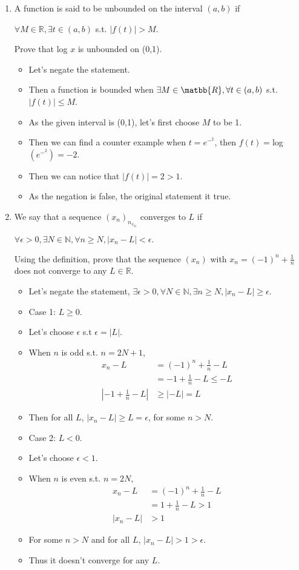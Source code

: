\documentclass[letterpaper,12pt]{article}
\begin{document}
\begin{enumerate}
\begin{itemize}
\end{itemize}
\item A function is said to be unbounded on the interval $(a,b)$ if 
\begin{center}
	$\forall M\in \mathbb{R}, \exists t\in (a,b)$ s.t. $|f(t)|>M.$
\end{center}
Prove that log $x$ is unbounded on (0,1).
\begin{itemize}
\item Let's negate the statement.
\item Then a function is bounded when $\exists M \in \matbb{R}, \forall t\in (a,b)$ s.t. $|f(t)| \leq M$.
\item As the given interval is (0,1), let's first choose $M$ to be 1.
\item Then we can find a counter example when $t=e^-^2$, then $f(t)=$log$(e^-^2)=-2$.
\item Then we can notice that $|f(t)|=2 > 1$.
\item As the negation is false, the original statement it true. 
\end{itemize}
\item We say that a sequence $(x_n)_n_\in_\mathbb{N}$ converges to $L$ if 
\begin{center}
$\forall \epsilon>0,\exists N \in \mathbb{N}, \forall n \geq N, |x_n-L|<\epsilon.$
\end{center}
Using the definition, prove that the sequence $(x_n)$ with $x_n = (-1)^n+\frac{1}{n}$ does not converge to any $L \in \mathbb{R}$.
\begin{itemize}
	\item Let's negate the statement, $\exists \epsilon>0,\forall N \in \mathbb{N},\exists n \geq N,|x_n-L| \geq \epsilon$.
	\item Case 1: $L \geq 0$.
	\item Let's choose $\epsilon$ s.t $\epsilon = |L|$.
	\item When $n$ is odd s.t. $n=2N+1$,
	\begin{align}
	x_n-L &= (-1)^n+\frac{1}{n}-L	 \\
	&=-1+\frac{1}{n}-L \leq-L \\|-1+\frac{1}{n}-L| &\geq |-L|=L
	\end{align}
	\item Then for all $L$, $|x_n-L| \geq L=\epsilon$, for some $n > N$.
	
	\item Case 2: $L <0$.
	\item Let's choose $\epsilon < 1$.
	\item When $n$ is even s.t. $n=2N$,
	\begin{align}
		x_n-L &= (-1)^n+\frac{1}{n}-L \\ &=1+\frac{1}{n}-L > 1\\ |x_n-L| &> 1
	\end{align}
	\item For some $n >N$  and for all $L$, $|x_n-L|>1>\epsilon$.
	\item Thus it doesn't converge for any $L$.
\end{itemize}


\end{enumerate}



\end{document}
